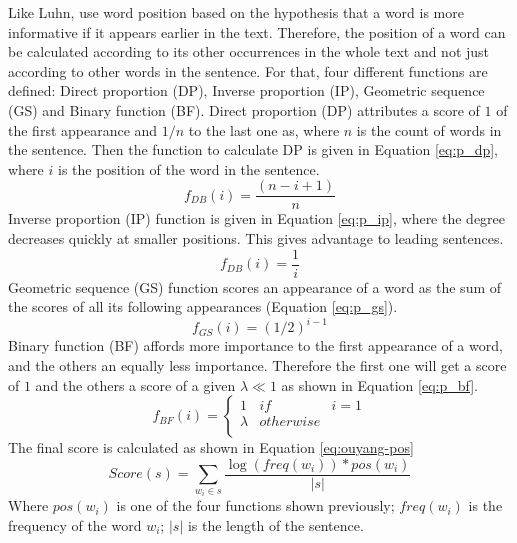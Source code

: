 Like Luhn, \citet{10-ouyang-al} use word position based on the hypothesis that a word is more informative if it appears earlier in the text.
Therefore, the position of a word can be calculated according to its other occurrences in the whole text and not just according to other words in the sentence.
For that, four different functions are defined: Direct proportion (DP), Inverse proportion (IP), Geometric sequence (GS) and Binary function (BF). 
Direct proportion (DP) attributes a score of $ 1 $ of the first appearance and $ 1/n $ to the last one as, where $ n $ is the count of words in the sentence. 
Then the function to calculate DP is given in Equation \ref{eq:p_dp}, where $ i $ is the position of the word in the sentence. 
\begin{equation}
\label{eq:p_dp}
f_{DB}(i) = \frac{(n - i +1)}{n}
\end{equation}
Inverse proportion (IP) function is given in Equation \ref{eq:p_ip}, where the degree decreases quickly at smaller positions. This gives advantage to leading sentences. 
\begin{equation}
\label{eq:p_ip}
f_{DB}(i) = \frac{1}{i}
\end{equation}
Geometric sequence (GS) function scores an appearance of a word as the sum of the scores of all its following appearances (Equation \ref{eq:p_gs}).
\begin{equation}
\label{eq:p_gs}
f_{GS} (i) = (1/2)^{i-1}
\end{equation}
Binary function (BF) affords more importance to the first appearance of a word, and the others an equally less importance.
Therefore the first one will get a score of $ 1 $ and the others a score of a given $ \lambda \ll 1 $ as shown in Equation \ref{eq:p_bf}.
\begin{equation}
\label{eq:p_bf}
f_{BF} (i) = \left\lbrace 
\begin{array}{lll}
1 & if & i = 1\\
\lambda & otherwise &  \\
\end{array}
\right. 
\end{equation}
The final score is calculated as shown in Equation \ref{eq:ouyang-pos} 
\begin{equation}
\label{eq:ouyang-pos}
Score(s) = \sum\limits_{w_i \in s} \frac{\log(freq(w_i)) * pos(w_i)}{|s|} 
\end{equation}
Where $ pos(w_i) $ is one of the four functions shown previously; $ freq(w_i) $ is the frequency of the word $ w_i $; $ |s| $ is the length of the sentence.

